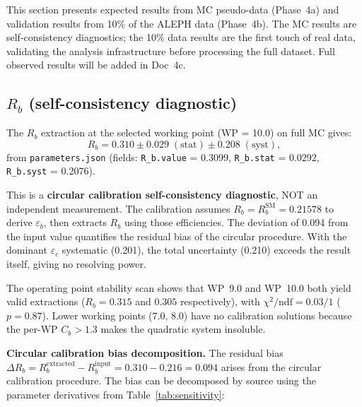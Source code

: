 \documentclass[11pt,a4paper]{article}
\begin{document}
This section presents expected results from MC pseudo-data (Phase~4a) and
validation results from 10\% of the ALEPH data (Phase~4b). The MC results are
self-consistency diagnostics; the 10\% data results are the first touch of real
data, validating the analysis infrastructure before processing the full dataset.
Full observed results will be added in Doc~4c.

\subsection{$R_b$ (self-consistency diagnostic)}
\label{sec:result_rb}

The $R_b$ extraction at the selected working point (WP = 10.0) on full MC gives:
\begin{equation}
R_b = 0.310 \pm 0.029\;\mathrm{(stat)} \pm 0.208\;\mathrm{(syst)},
\label{eq:rb_result}
\end{equation}
from \texttt{parameters.json} (fields: \texttt{R\_b.value} = 0.3099,
\texttt{R\_b.stat} = 0.0292, \texttt{R\_b.syst} = 0.2076).

This is a \textbf{circular calibration self-consistency diagnostic}, NOT an independent
measurement. The calibration assumes $R_b = R_b^\mathrm{SM} = 0.21578$ to derive
$\varepsilon_b$, then extracts $R_b$ using those efficiencies. The deviation of 0.094
from the input value quantifies the residual bias of the circular procedure. With the
dominant $\varepsilon_c$ systematic (0.201), the total uncertainty (0.210)
exceeds the result itself, giving no resolving power.

The operating point stability scan shows that WP~9.0 and WP~10.0 both yield valid
extractions ($R_b = 0.315$ and $0.305$ respectively), with $\chi^2/\mathrm{ndf} = 0.03/1$
($p = 0.87$). Lower working points (7.0, 8.0) have no calibration solutions because
the per-WP $C_b > 1.3$ makes the quadratic system insoluble.

\textbf{Circular calibration bias decomposition.}
The residual bias $\Delta R_b = R_b^\mathrm{extracted} - R_b^\mathrm{input} =
0.310 - 0.216 = 0.094$ arises from the circular calibration procedure. The bias
can be decomposed by source using the parameter derivatives from
Table~\ref{tab:sensitivity}:
\end{document}
